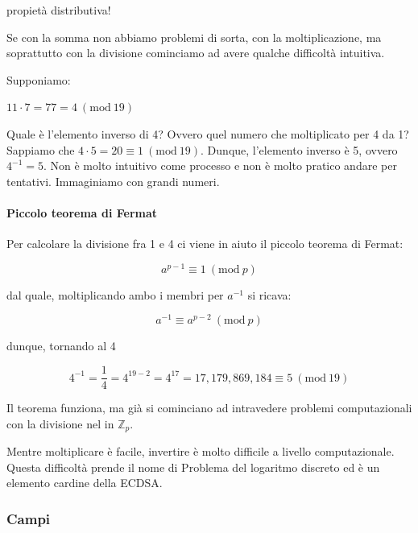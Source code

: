 \documentclass{article}
\newcommand{\Mod}[1]{\ (\mathrm{mod}\ #1)}
\newcommand{\Zp}{\mathbb{Z}_{p}}
\begin{document}
propietà distributiva!

Se con la somma non abbiamo problemi di sorta, con la moltiplicazione, ma soprattutto con la divisione cominciamo ad avere qualche difficoltà intuitiva.

Supponiamo:

$11 \cdot 7 = 77 = 4 \Mod{19}$

Quale è l’elemento inverso di 4? Ovvero quel numero che moltiplicato per 4 da 1? 
Sappiamo che $4 \cdot 5 = 20 \equiv 1 \Mod{19}$. 
Dunque, l’elemento inverso è 5, ovvero $4^{-1} = 5$. 
Non è molto intuitivo come processo e non è molto pratico andare per tentativi. Immaginiamo con grandi numeri.

\paragraph{Piccolo teorema di Fermat}
Per calcolare la divisione fra 1 e 4 ci viene in aiuto il piccolo teorema di Fermat:

\begin{equation}
    a^{p-1} \equiv 1 \Mod{p} \label{piccolo_teorema_di_fermat}
\end{equation}

dal quale, moltiplicando ambo i membri per $a^{-1}$ si ricava:

\begin{equation}
    a^{-1} \equiv a^{p-2} \Mod{p} \label{piccolo_teorema_di_fermat}
\end{equation}

dunque, tornando al 4

$$
4^{-1} = \frac{1}{4} = 4^{19-2} = 4^{17} = 17,179,869,184 \equiv 5 \Mod{19}
$$

Il teorema funziona, ma già si cominciano ad intravedere problemi computazionali con la divisione nel in $\Zp$.

Mentre moltiplicare è facile, invertire è molto difficile a livello computazionale. 
Questa difficoltà prende il nome di Problema del logaritmo discreto ed è un elemento cardine della ECDSA.

\subsubsection{Campi}


\end{document}
